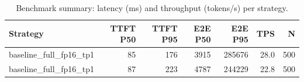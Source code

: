 \begin{table}
\caption{Benchmark summary: latency (ms) and throughput (tokens/s) per strategy.}
\label{tab:summary}
\begin{tabular}{lrrrrrr}
\toprule
Strategy & TTFT P50 & TTFT P95 & E2E P50 & E2E P95 & TPS & N \\
\midrule
baseline_full_fp16_tp1 & 85 & 176 & 3915 & 285676 & 28.0 & 500 \\
baseline_full_fp16_tp1 & 87 & 223 & 4787 & 244229 & 22.8 & 500 \\
\bottomrule
\end{tabular}
\end{table}
